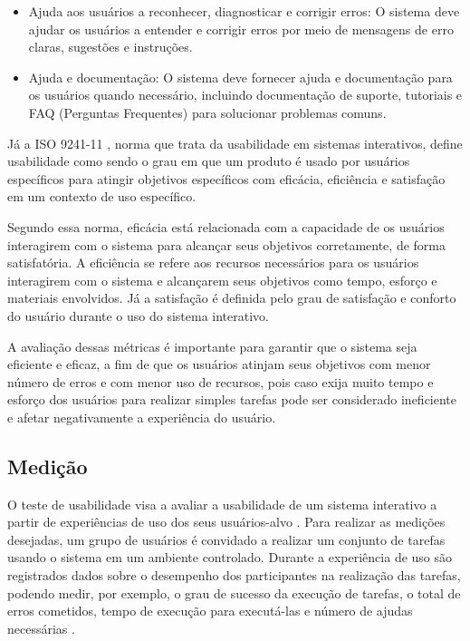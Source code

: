 \begin{description}
\begin{itemize}
            \item Ajuda aos usuários a reconhecer, diagnosticar e corrigir erros: O sistema deve ajudar os usuários a entender 
            e corrigir erros por meio de mensagens de erro claras, sugestões e instruções.

            \item Ajuda e documentação: O sistema deve fornecer ajuda e documentação para os usuários quando necessário, incluindo 
            documentação de suporte, tutoriais e FAQ (Perguntas Frequentes) para solucionar problemas comuns.
        \end{itemize}
\end{description}

Já a ISO 9241-11 \cite{iso9241}, norma que trata da usabilidade em sistemas interativos, define usabilidade como sendo o grau em que 
um produto é usado por usuários específicos para atingir objetivos específicos com eficácia, eficiência e satisfação em um contexto 
de uso específico.

Segundo essa norma, eficácia está relacionada com a capacidade de os usuários interagirem com o sistema para alcançar seus objetivos 
corretamente, de forma satisfatória. A eficiência se refere aos recursos necessários para os usuários interagirem 
com o sistema e alcançarem seus objetivos como tempo, esforço e materiais envolvidos. Já a satisfação é definida pelo grau de satisfação e 
conforto do usuário durante o uso do sistema interativo.

A avaliação dessas métricas é importante para garantir que o sistema seja eficiente e eficaz, a fim de que os usuários atinjam seus objetivos 
com menor número de erros e com menor uso de recursos, pois caso exija muito tempo e esforço dos usuários para realizar simples tarefas pode 
ser considerado ineficiente e afetar negativamente a experiência do usuário.

\subsection{Medição}
\label{sec:Medição1}

O teste de usabilidade visa a avaliar a usabilidade de um sistema interativo a partir de experiências de uso dos seus usuários-alvo \cite{rubin2011}. 
Para realizar as medições desejadas, um grupo de usuários é convidado a realizar um conjunto de tarefas usando o sistema em um ambiente controlado. Durante a experiência de 
uso são registrados dados sobre o desempenho dos participantes na realização das tarefas, podendo medir, por exemplo, o grau de sucesso da execução de tarefas, o total de 
erros cometidos, tempo de execução para executá-las e número de ajudas necessárias \cite{barbosa2010}.

